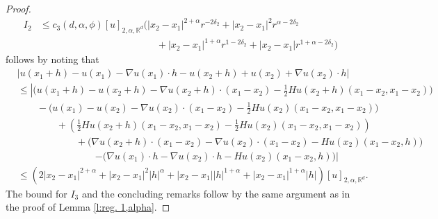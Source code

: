 \documentclass[12pt,a4paper,onecolumn]{amsart}
\theoremstyle{definition}
\newcommand{\R}{\mathbb{R}}
\newcommand{\1}{\mathbf 1}
\numberwithin{equation}{section}
\begin{document}
\begin{proof}
\begin{align}
         I_2&\le c_3(d,\alpha,\phi)[u]_{2,\alpha,\R^d}\big(|x_2-x_1|^{2+\alpha} r^{-2\delta_2}+|x_2-x_1|^2 r^{\alpha-2\delta_2}\\
         &\hspace{12em}+|x_2-x_1|^{1+\alpha} r^{1-2\delta_2}+|x_2-x_1|r^{1+\alpha-2\delta_2}\big)
     \end{align}
     follows by noting that
     \begin{align*}
         &|u(x_1+h)-u(x_1)-\nabla u(x_1)\cdot h-u(x_2+h)+u(x_2)+\nabla u(x_2)\cdot h|\\
         &\le\left|\big(u(x_1+h)-u(x_2+h)-\nabla u(x_2+h)\cdot ({x_1-x_2})-\frac12 Hu(x_2+h)({x_1-x_2},{x_1-x_2})\big)\right.\\
         &\hspace{2em}-\big(u(x_1)-u(x_2)-\nabla u(x_2)\cdot ({x_1-x_2})-\frac12 Hu(x_2)({x_1-x_2},{x_1-x_2})\big)\\
         &\hspace{4em}+\left(\frac12 Hu(x_2+h)({x_1-x_2},{x_1-x_2})-\frac12 Hu(x_2)({x_1-x_2},{x_1-x_2})\right)\\
         &\hspace{6em}+\big(\nabla u(x_2+h)\cdot ({x_1-x_2})-\nabla u(x_2)\cdot ({x_1-x_2})-Hu(x_2)({x_1-x_2},h)\big)\\
         &\hspace{8em}\left.-\big(\nabla u(x_1)\cdot h-\nabla u(x_2)\cdot h-Hu(x_2)({x_1-x_2},h)\big)\right|\\
         &\le (2|x_2-x_1|^{2+\alpha}+|x_2-x_1|^{2}|h|^\alpha+|x_2-x_1||h|^{1+\alpha}+|x_2-x_1|^{1+\alpha}|h|)[u]_{2,\alpha,\R^d}.
     \end{align*}     
     The bound for $I_3$ and the concluding remarks follow by the same argument as in the proof of Lemma \ref{l:reg. 1,alpha}.
\end{proof}
\end{document}
